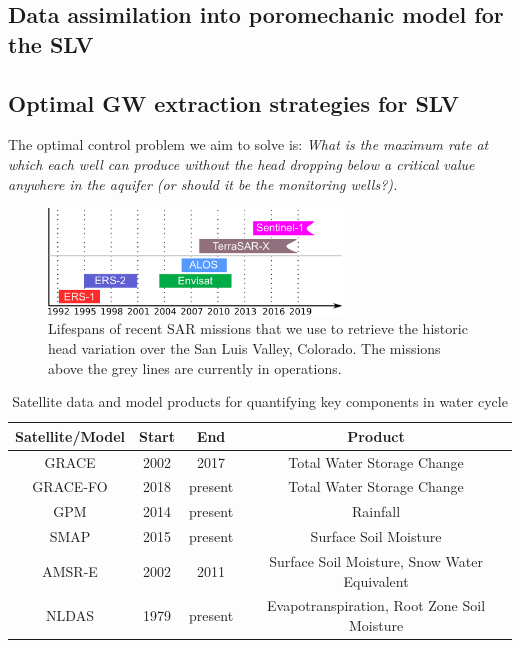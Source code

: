 \documentclass[11pt,final]{article}%
\begin{document}
\subsection{Data assimilation into poromechanic model for the SLV}\label{sec:proposed inverse}

\subsection{Optimal GW extraction strategies for SLV}\label{sec:proposed optimal}
The optimal control problem we aim to solve is: \emph{What is the maximum rate at which each well can produce without the head dropping below a critical value anywhere in the aquifer (or should it be the monitoring wells?).}

\begin{figure}
\noindent\includegraphics[width=0.7\textwidth]{Figures/InSARmissions.pdf}
\caption{Lifespans of recent SAR missions that we use to retrieve the historic head variation over the San Luis Valley, Colorado. The missions above the grey lines are currently in operations.}
\label{fig:insar-mission}
\end{figure}

\begin{table}
\caption{Satellite data and model products for quantifying key components in water cycle}
\centering
\begin{tabular}{c c c c }
\hline\hline
Satellite/Model & Start & End  & Product \\[0.5ex]
\hline
GRACE & 2002 & 2017 & Total Water Storage Change \\
GRACE-FO & 2018 & present & Total Water Storage Change \\
GPM & 2014 & present & Rainfall \\
SMAP & 2015& present & Surface Soil Moisture \\
AMSR-E & 2002 & 2011 & Surface Soil Moisture, Snow Water Equivalent \\
NLDAS & 1979 & present & Evapotranspiration, Root Zone Soil Moisture \\[1.0 ex]
\hline
\end{tabular}
\label{tb:data}
\end{table}
\end{document}
